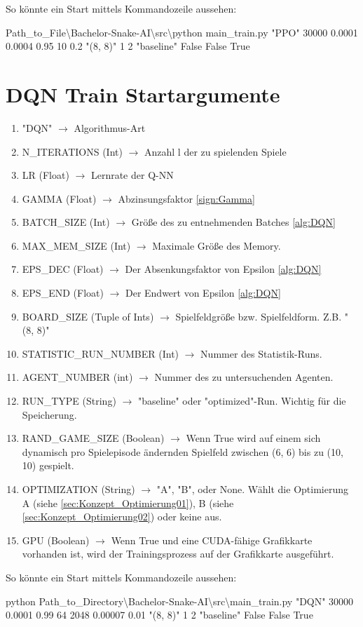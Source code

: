 So könnte ein Start mittels Kommandozeile aussehen:
\begin{center}
	Path\_to\_File\textbackslash Bachelor-Snake-AI\textbackslash src\textbackslash python main\_train.py "PPO"{} 30000 0.0001 0.0004 0.95 10 0.2 "(8, 8)"{} 1 2 "baseline"{} False False True
\end{center}

\section{DQN Train Startargumente} \label{sec:Anleitung_DQN_Train_Startargumente}
\begin{enumerate}
	\item "DQN" $\longrightarrow$ Algorithmus-Art
	\item N\_ITERATIONS (Int) $\longrightarrow$ Anzahl l der zu spielenden Spiele
	\item LR (Float) $\longrightarrow$ Lernrate der Q-NN
	\item GAMMA (Float) $\longrightarrow$ Abzinsungsfaktor \ref{sign:Gamma}
	\item BATCH\_SIZE (Int) $\longrightarrow$ Größe des zu entnehmenden Batches \ref{alg:DQN}
	\item MAX\_MEM\_SIZE (Int) $\longrightarrow$ Maximale Größe des Memory.
	\item EPS\_DEC (Float) $\longrightarrow$ Der Absenkungsfaktor von Epsilon \ref{alg:DQN}
	\item EPS\_END (Float) $\longrightarrow$ Der Endwert von Epsilon \ref{alg:DQN}
	\item BOARD\_SIZE (Tuple of Ints) $\longrightarrow$ Spielfeldgröße bzw. Spielfeldform. Z.B. "(8, 8)"
	\item STATISTIC\_RUN\_NUMBER (Int) $\longrightarrow$ Nummer des Statistik-Runs.
	\item AGENT\_NUMBER (int) $\longrightarrow$ Nummer des zu untersuchenden Agenten.
	\item RUN\_TYPE (String) $\longrightarrow$ "baseline" oder "optimized"-Run. Wichtig für die Speicherung.
	\item RAND\_GAME\_SIZE (Boolean) $\longrightarrow$ Wenn True wird auf einem sich dynamisch pro Spielepisode ändernden Spielfeld zwischen (6, 6) bis zu (10, 10) gespielt.
	\item OPTIMIZATION (String) $\longrightarrow$ "A", "B", oder None. Wählt die Optimierung A (siehe \ref{sec:Konzept_Optimierung01}), B (siehe \ref{sec:Konzept_Optimierung02}) oder keine aus.
	\item GPU (Boolean) $\longrightarrow$ Wenn True und eine CUDA-fähige Grafikkarte vorhanden ist, wird der Trainingsprozess auf der Grafikkarte ausgeführt.
\end{enumerate}
So könnte ein Start mittels Kommandozeile aussehen:
\begin{center}
	python Path\_to\_Directory\textbackslash Bachelor-Snake-AI\textbackslash src\textbackslash main\_train.py "DQN"{} 30000 0.0001 0.99 64 2048 0.00007 0.01 "(8, 8)"{} 1 2 "baseline"{} False False True
\end{center}

